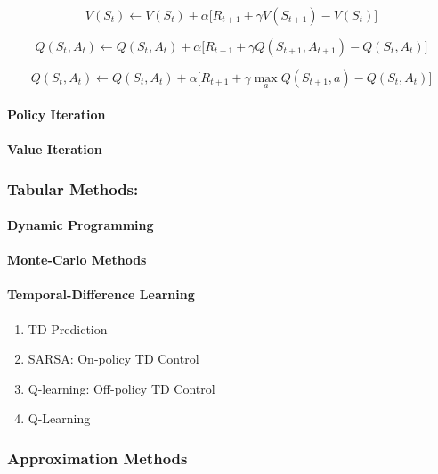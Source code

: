 \documentclass[a4paper, twoside, 12pt]{article}
\begin{document}
\begin{equation}
    V(S_t) \leftarrow V(S_t) + \alpha\big[R_{t+1}+\gamma V(S_{t+1}) - V(S_t)\big]
\end{equation}

\begin{equation} \label{eq-sarsa}
    Q(S_t, A_t) \leftarrow Q(S_t,A_t) + \alpha\big[R_{t+1}+\gamma Q(S_{t+1},A_{t+1}) - Q(S_t, A_t)\big]
\end{equation}

\begin{equation} \label{eq-q-learning}
    Q(S_t, A_t) \leftarrow Q(S_t,A_t) + \alpha\big[R_{t+1}+\gamma\max_a Q(S_{t+1},a) - Q(S_t, A_t)\big]
\end{equation}


\paragraph{Policy Iteration}
\label{sec:orga53f63a}
\paragraph{Value Iteration}
\label{sec:org9573929}
\subsubsection{Tabular Methods:}
\label{sec:orge293eb4}
\paragraph{Dynamic Programming}
\label{sec:orge49e3a8}
\paragraph{Monte-Carlo Methods}
\label{sec:orge358ad8}
\paragraph{Temporal-Difference Learning}
\label{sec:org521f786}
\begin{enumerate}
\item TD Prediction
\label{sec:org76792ac}
\item SARSA: On-policy TD Control
\label{sec:org565542d}
\item Q-learning: Off-policy TD Control
\label{sec:orgd23652a}
\item Q-Learning
\label{sec:org14c6bfd}
\end{enumerate}
\subsubsection{Approximation Methods}
\label{sec:orgda50adc}
\end{document}
